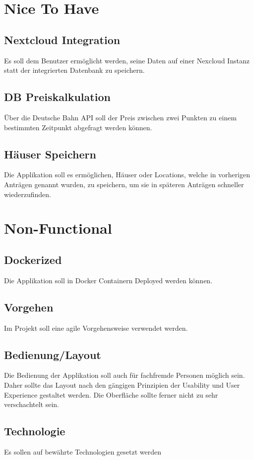\section{Nice To Have}\label{sec:nice-to-have}
\subsection{Nextcloud Integration}\label{subsec:nextcloud-integration}
Es soll dem Benutzer ermöglicht werden, seine Daten auf einer Nexcloud Instanz statt der integrierten Datenbank zu speichern.
\subsection{DB Preiskalkulation}\label{subsec:db-preiskalkulation}
Über die Deutsche Bahn \ac{API} soll der Preis zwischen zwei Punkten zu einem bestimmten Zeitpunkt abgefragt werden können.
\subsection{Häuser Speichern}\label{subsec:hauser-speichern}
Die Applikation soll es ermöglichen, Häuser oder Locations, welche in vorherigen Anträgen genannt wurden, zu speichern,
um sie in späteren Anträgen schneller wiederzufinden.


\section{Non-Functional}\label{sec:non-functional}
\subsection{Dockerized}\label{subsec:dockerized}
Die Applikation soll in Docker Containern Deployed werden können.
\subsection{Vorgehen}\label{subsec:vorgehen}
Im Projekt soll eine agile Vorgehensweise verwendet werden.
\subsection{Bedienung/Layout}\label{subsec:bedienung/layout}
Die Bedienung der Applikation soll auch für fachfremde Personen möglich sein.
Daher sollte das Layout nach den gängigen Prinzipien der Usability und User Experience gestaltet werden.
Die Oberfläche sollte ferner nicht zu sehr verschachtelt sein.
\subsection{Technologie}\label{subsec:technologie}
Es sollen auf bewährte Technologien gesetzt werden

